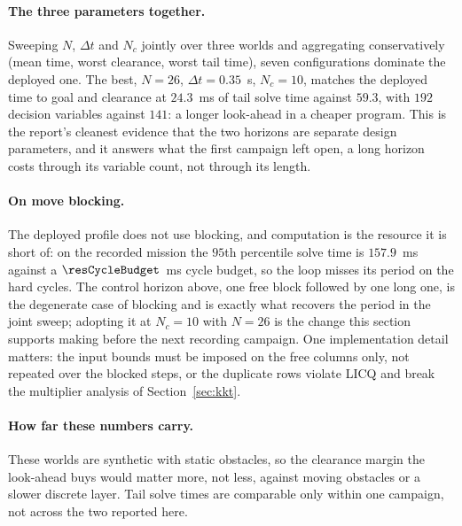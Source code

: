 \documentclass[11pt,a4paper]{article}
\newcommand{\Ninput}{N_c}
\begin{document}
\paragraph{The three parameters together.} Sweeping $N$, $\Delta t$ and $\Ninput$ jointly over three worlds
and aggregating conservatively (mean time, worst clearance, worst tail time), seven configurations dominate
the deployed one. The best, $N=26$, $\Delta t=0.35$~s, $\Ninput=10$, matches the deployed time to goal and
clearance at $24.3$~ms of tail solve time against $59.3$, with $192$ decision variables against $141$: a
longer look-ahead in a cheaper program. This is the report's cleanest evidence that the two horizons are
separate design parameters, and it answers what the first campaign left open, a long horizon costs through
its variable count, not through its length.

\paragraph{On move blocking.} The deployed profile does not use blocking, and computation is the resource it
is short of: on the recorded mission the $95$th percentile solve time is $157.9$~ms against a
$\resCycleBudget$~ms cycle budget, so the loop misses its period on the hard cycles. The control horizon
above, one free block followed by one long one, is the degenerate case of blocking and is exactly what
recovers the period in the joint sweep; adopting it at $\Ninput=10$ with $N=26$ is the change this section
supports making before the next recording campaign. One implementation detail matters: the input bounds must
be imposed on the free columns only, not repeated over the blocked steps, or the duplicate rows violate LICQ
and break the multiplier analysis of Section~\ref{sec:kkt}.


\paragraph{How far these numbers carry.} These worlds are synthetic with static obstacles, so the clearance
margin the look-ahead buys would matter more, not less, against moving obstacles or a slower discrete layer.
Tail solve times are comparable only within one campaign, not across the two reported here.
\end{document}
